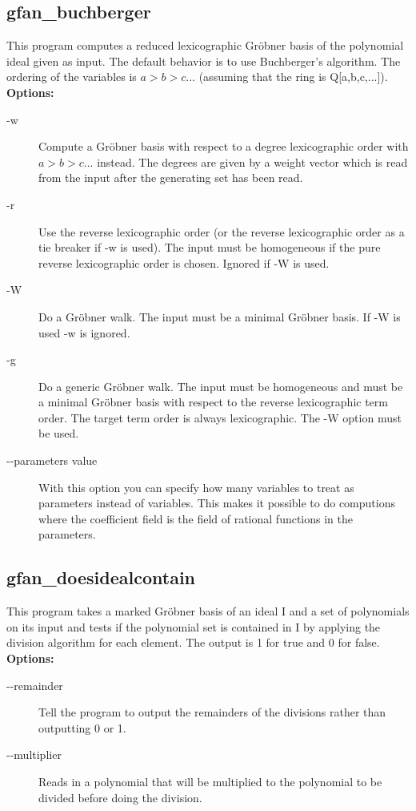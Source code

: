 {{\subsection{gfan\_buchberger}\label{applist:_buchberger}
This program computes a reduced lexicographic Gr\"obner basis of the polynomial ideal given as input. The default behavior is to use Buchberger's algorithm. The ordering of the variables is $a>b>c...$ (assuming that the ring is Q[a,b,c,...]).
\newline
{\bf Options:}
\begin{description}
\item[-w]Compute a Gr\"obner basis with respect to a degree lexicographic order with $a>b>c...$ instead. The degrees are given by a weight vector which is read from the input after the generating set has been read.
\item[-r]Use the reverse lexicographic order (or the reverse lexicographic order as a tie breaker if -w is used). The input must be homogeneous if the pure reverse lexicographic order is chosen. Ignored if -W is used.
\item[-W]Do a Gr\"obner walk. The input must be a minimal Gr\"obner basis. If -W is used -w is ignored.
\item[-g]Do a generic Gr\"obner walk. The input must be homogeneous and must be a minimal Gr\"obner basis with respect to the reverse lexicographic term order. The target term order is always lexicographic. The -W option must be used.
\item[-\hspace{0.013cm}-parameters value]With this option you can specify how many variables to treat as parameters instead of variables. This makes it possible to do computions where the coefficient field is the field of rational functions in the parameters.\end{description}


{\subsection{gfan\_doesidealcontain}\label{applist:_doesidealcontain}
This program takes a marked Gr\"obner basis of an ideal I and a set of polynomials on its input and tests if the polynomial set is contained in I by applying the division algorithm for each element. The output is 1 for true and 0 for false.
\newline
{\bf Options:}
\begin{description}
\item[-\hspace{0.013cm}-remainder]Tell the program to output the remainders of the divisions rather than outputting 0 or 1.\item[-\hspace{0.013cm}-multiplier]Reads in a polynomial that will be multiplied to the polynomial to be divided before doing the division.\end{description}


}}}

